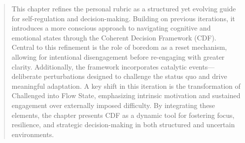 \renewcommand{\abstractname}{Abstract}

\begin{abstract}
This chapter refines the personal rubric as a structured yet evolving guide for self-regulation and decision-making. Building on previous iterations, it introduces a more conscious approach to navigating cognitive and emotional states through the Coherent Decision Framework (CDF). Central to this refinement is the role of boredom as a reset mechanism, allowing for intentional disengagement before re-engaging with greater clarity. Additionally, the framework incorporates catalytic events—deliberate perturbations designed to challenge the status quo and drive meaningful adaptation. A key shift in this iteration is the transformation of Challenged into Flow State, emphasizing intrinsic motivation and sustained engagement over externally imposed difficulty. By integrating these elements, the chapter presents CDF as a dynamic tool for fostering focus, resilience, and strategic decision-making in both structured and uncertain environments.
\end{abstract}




